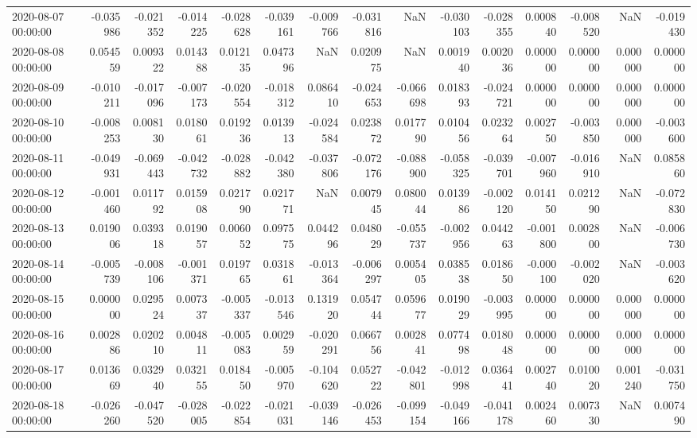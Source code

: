 \begin{tabular}{lrrrrrrrrrrrrrr}
2020-08-07 00:00:00 & -0.035986 & -0.021352 & -0.014225 & -0.028628 & -0.039161 & -0.009766 & -0.031816 & NaN & -0.030103 & -0.028355 & 0.000840 & -0.008520 & NaN & -0.019430 \\
2020-08-08 00:00:00 & 0.054559 & 0.009322 & 0.014388 & 0.012135 & 0.047396 & NaN & 0.020975 & NaN & 0.001940 & 0.002036 & 0.000000 & 0.000000 & 0.000000 & 0.000000 \\
2020-08-09 00:00:00 & -0.010211 & -0.017096 & -0.007173 & -0.020554 & -0.018312 & 0.086410 & -0.024653 & -0.066698 & 0.018393 & -0.024721 & 0.000000 & 0.000000 & 0.000000 & 0.000000 \\
2020-08-10 00:00:00 & -0.008253 & 0.008130 & 0.018061 & 0.019236 & 0.013913 & -0.024584 & 0.023872 & 0.017790 & 0.010456 & 0.023264 & 0.002750 & -0.003850 & 0.000000 & -0.003600 \\
2020-08-11 00:00:00 & -0.049931 & -0.069443 & -0.042732 & -0.028882 & -0.042380 & -0.037806 & -0.072176 & -0.088900 & -0.058325 & -0.039701 & -0.007960 & -0.016910 & NaN & 0.085860 \\
2020-08-12 00:00:00 & -0.001460 & 0.011792 & 0.015908 & 0.021790 & 0.021771 & NaN & 0.007945 & 0.080044 & 0.013986 & -0.002120 & 0.014150 & 0.021290 & NaN & -0.072830 \\
2020-08-13 00:00:00 & 0.019006 & 0.039318 & 0.019057 & 0.006052 & 0.097575 & 0.044296 & 0.048029 & -0.055737 & -0.002956 & 0.044263 & -0.001800 & 0.002800 & NaN & -0.006730 \\
2020-08-14 00:00:00 & -0.005739 & -0.008106 & -0.001371 & 0.019765 & 0.031861 & -0.013364 & -0.006297 & 0.005405 & 0.038538 & 0.018650 & -0.000100 & -0.002020 & NaN & -0.003620 \\
2020-08-15 00:00:00 & 0.000000 & 0.029524 & 0.007337 & -0.005337 & -0.013546 & 0.131920 & 0.054744 & 0.059677 & 0.019029 & -0.003995 & 0.000000 & 0.000000 & 0.000000 & 0.000000 \\
2020-08-16 00:00:00 & 0.002886 & 0.020210 & 0.004811 & -0.005083 & 0.002959 & -0.020291 & 0.066756 & 0.002841 & 0.077498 & 0.018048 & 0.000000 & 0.000000 & 0.000000 & 0.000000 \\
2020-08-17 00:00:00 & 0.013669 & 0.032940 & 0.032155 & 0.018450 & -0.005970 & -0.104620 & 0.052722 & -0.042801 & -0.012998 & 0.036441 & 0.002740 & 0.010020 & 0.001240 & -0.031750 \\
2020-08-18 00:00:00 & -0.026260 & -0.047520 & -0.028005 & -0.022854 & -0.021031 & -0.039146 & -0.026453 & -0.099154 & -0.049166 & -0.041178 & 0.002460 & 0.007330 & NaN & 0.007490 \\

\end{tabular}
